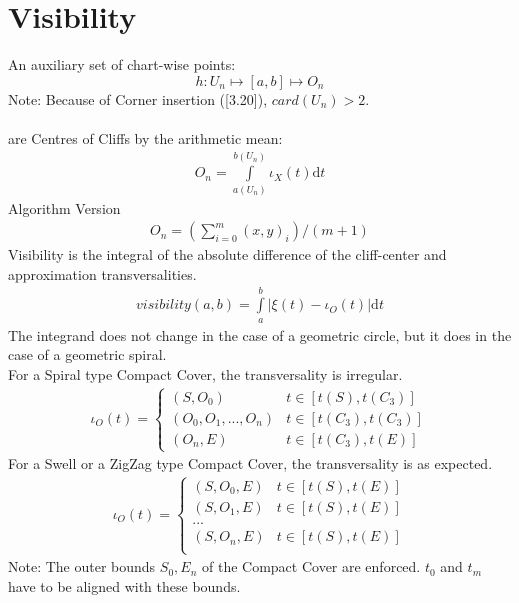 \documentclass{report}
\begin{document}
\chapter{Visibility}
An auxiliary set of chart-wise points:
\begin{equation}
h: U_{n} \mapsto [a,b] \mapsto O_{n}
\end{equation}
Note: Because of Corner insertion (\cite{Stopeight}[3.20]), $card(U_{n}) > 2$.\\\\
are Centres of Cliffs by the arithmetic mean:
\begin{align}
O_{n}=\int \limits _{a(U_{n})}^{b(U_{n})} \iota_{X}(t)\mathrm{d}t
\end{align}
Algorithm Version
\begin{align}
O_{n}=(\sum \limits _{i=0}^{m} (x,y)_{i})/(m+1)
\end{align}
Visibility is the integral of the absolute difference of the cliff-center and approximation transversalities.
\begin{align}
visibility(a,b)= \int \limits _{a}^{b} \vert \xi(t)-\iota_{O}(t)\vert  \mathrm{d}t
\end{align}
The integrand does not change in the case of a geometric circle, but it does in the case of a geometric spiral.\\
For a Spiral type Compact Cover, the transversality is irregular.
\begin{align*}
\iota_{O}(t) =
\begin{cases}
(S,O_{0}) & t \in [t(S),t(C_{3})]\\
(O_{0},O_{1}, ... , O_{n}) & t \in [t(C_{3}),t(C_{3})]\\
(O_{n},E) & t \in [t(C_{3}),t(E)]
\end{cases}
\end{align*}
For a Swell or a ZigZag type Compact Cover, the transversality is as expected.
\begin{align*}
\iota_{O}(t) =
\begin{cases}
(S,O_{0},E) & t \in [t(S),t(E)]\\
(S,O_{1},E) & t \in [t(S),t(E)]\\
...\\
(S,O_{n},E) & t \in [t(S),t(E)]\\
\end{cases}
\end{align*}
Note: The outer bounds $S_{0},E_{n}$ of the Compact Cover are enforced. $t_{0}$ and $t_{m}$ have to be aligned with these bounds.
\end{document}
